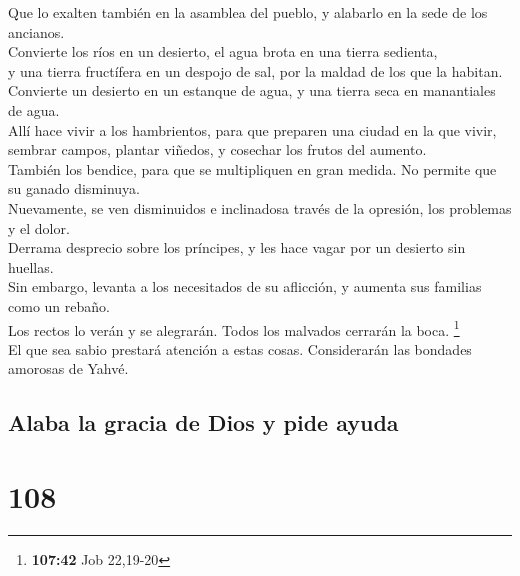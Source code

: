  Que lo exalten también en la asamblea del pueblo, y
alabarlo en la sede de los ancianos.\\
 Convierte los ríos en un desierto, el agua brota en una
tierra sedienta,\\
 y una tierra fructífera en un despojo de sal, por la
maldad de los que la habitan.\\
 Convierte un desierto en un estanque de agua, y una
tierra seca en manantiales de agua.\\
 Allí hace vivir a los hambrientos, para que preparen una
ciudad en la que vivir,\\
 sembrar campos, plantar viñedos, y cosechar los frutos
del aumento.\\
 También los bendice, para que se multipliquen en gran
medida. No permite que su ganado disminuya.\\
 Nuevamente, se ven disminuidos e inclinadosa través de
la opresión, los problemas y el dolor.\\
 Derrama desprecio sobre los príncipes, y les hace vagar
por un desierto sin huellas.\\
 Sin embargo, levanta a los necesitados de su aflicción,
y aumenta sus familias como un rebaño.\\
 Los rectos lo verán y se alegrarán. Todos los malvados
cerrarán la boca. \footnote{\textbf{107:42} Job 22,19-20}\\
 El que sea sabio prestará atención a estas cosas.
Considerarán las bondades amorosas de Yahvé.

\hypertarget{alaba-la-gracia-de-dios-y-pide-ayuda}{%
\subsection{Alaba la gracia de Dios y pide
ayuda}\label{alaba-la-gracia-de-dios-y-pide-ayuda}}

\hypertarget{section-105}{%
\section{108}\label{section-105}}

